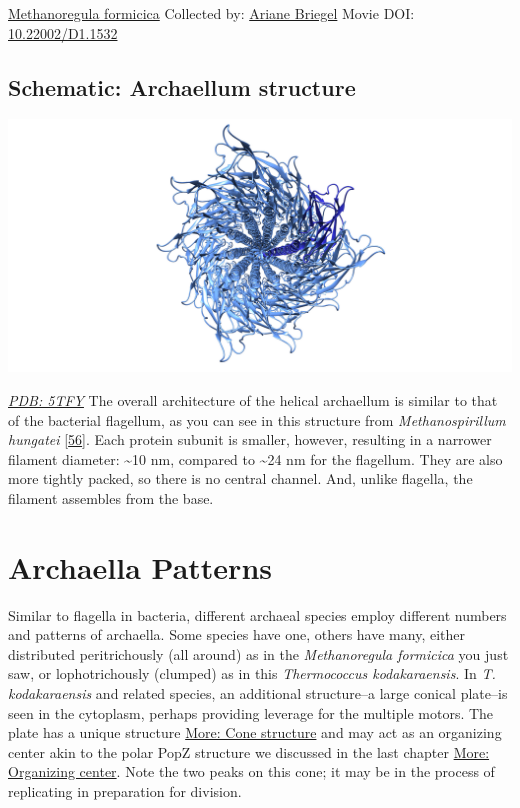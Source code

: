 \documentclass[]{tufte-book}
\begin{document}
\hypertarget{htmlwidget-587dee9e15d4261424e2}{}

\label{fig:6-8}\protect\hyperlink{tree}{Methanoregula formicica} Collected by: \protect\hyperlink{ariane_briegel}{Ariane Briegel} Movie DOI: \href{https://doi.org/10.22002/D1.1532}{10.22002/D1.1532}

\hypertarget{Archaellum_structure}{%
\subsection*{Schematic: Archaellum structure}\label{Archaellum_structure}}

\includegraphics{img/schematics/6_8_1}

\href{http://rcsb.org/structure/5TFY}{\emph{PDB: 5TFY}}
The overall architecture of the helical archaellum is similar to that of the bacterial flagellum, as you can see in this structure from \emph{Methanospirillum hungatei} {[}\protect\hyperlink{ref-poweleit2016}{56}{]}. Each protein subunit is smaller, however, resulting in a narrower filament diameter: \textasciitilde{}10 nm, compared to \textasciitilde{}24 nm for the flagellum. They are also more tightly packed, so there is no central channel. And, unlike flagella, the filament assembles from the base.

\hypertarget{archaella-patterns}{%
\section{Archaella Patterns}\label{archaella-patterns}}

Similar to flagella in bacteria, different archaeal species employ different numbers and patterns of archaella. Some species have one, others have many, either distributed peritrichously (all around) as in the \emph{Methanoregula formicica} you just saw, or lophotrichously (clumped) as in this \emph{Thermococcus kodakaraensis}. In \emph{T. kodakaraensis} and related species, an additional structure--a large conical plate--is seen in the cytoplasm, perhaps providing leverage for the multiple motors. The plate has a unique structure \protect\hyperlink{Cone_structure}{More: Cone structure} and may act as an organizing center akin to the polar PopZ structure we discussed in the last chapter \protect\hyperlink{Organizing_center}{More: Organizing center}. Note the two peaks on this cone; it may be in the process of replicating in preparation for division.
\end{document}
